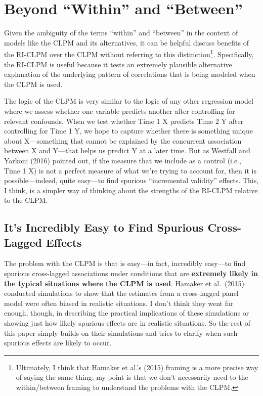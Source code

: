 \documentclass[
  english,
  man,floatsintext]{apa6}
\begin{document}
\hypertarget{beyond-within-and-between}{%
\section{Beyond ``Within'' and ``Between''}\label{beyond-within-and-between}}

Given the ambiguity of the terms ``within'' and ``between'' in the context of models like the CLPM and its alternatives, it can be helpful discuss benefits of the RI-CLPM over the CLPM without referring to this distinction\footnote{Ultimately, I think that Hamaker et al.'s (2015) framing is a more precise way of saying the same thing; my point is that we don't necessarily need to the within/between framing to understand the problems with the CLPM.}. Specifically, the RI-CLPM is useful because it tests an extremely plausible alternative explanation of the underlying pattern of correlations that is being modeled when the CLPM is used.

The logic of the CLPM is very similar to the logic of any other regression model where we assess whether one variable predicts another after controlling for relevant confounds. When we test whether Time 1 X predicts Time 2 Y after controlling for Time 1 Y, we hope to capture whether there is something unique about X---something that cannot be explained by the concurrent association between X and Y---that helps us predict Y at a later time. But as Westfall and Yarkoni (2016) pointed out, if the measure that we include as a control (i.e., Time 1 X) is not a perfect measure of what we're trying to account for, then it is possible---indeed, quite easy---to find spurious ``incremental validity'' effects. This, I think, is a simpler way of thinking about the strengths of the RI-CLPM relative to the CLPM.

\hypertarget{its-incredibly-easy-to-find-spurious-cross-lagged-effects}{%
\subsection{It's Incredibly Easy to Find Spurious Cross-Lagged Effects}\label{its-incredibly-easy-to-find-spurious-cross-lagged-effects}}

The problem with the CLPM is that is easy---in fact, incredibly easy---to find spurious cross-lagged associations under conditions that are \textbf{extremely likely in the typical situations where the CLPM is used}. Hamaker et al.~(2015) conducted simulations to show that the estimates from a cross-lagged panel model were often biased in realistic situations. I don't think they went far enough, though, in describing the practical implications of these simulations or showing just how likely spurious effects are in realistic situations. So the rest of this paper simply builds on their simulations and tries to clarify when such spurious effects are likely to occur.
\end{document}

